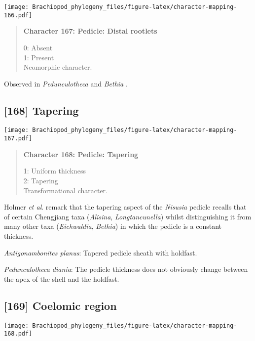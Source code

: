 \documentclass[openany]{book}
\theoremstyle{definition}
\theoremstyle{definition}
\theoremstyle{definition}
\theoremstyle{remark}
\begin{document}
\texttt{[image: Brachiopod\_phylogeny\_files/figure-latex/character-mapping-166.pdf]}

\begin{quote}
\textbf{Character 167: Pedicle: Distal rootlets}

0: Absent\\
1: Present\\
Neomorphic character.
\end{quote}

Observed in \emph{Pedunculotheca} and \emph{Bethia}
\citep{Sutton2005Silurianbrachiopods}.

\subsection*{{[}168{]} Tapering}\label{tapering}

\texttt{[image: Brachiopod\_phylogeny\_files/figure-latex/character-mapping-167.pdf]}

\begin{quote}
\textbf{Character 168: Pedicle: Tapering}

1: Uniform thickness\\
2: Tapering\\
Transformational character.
\end{quote}

Holmer \emph{et al}. \citeyearpar{Holmer2018Theattachment} remark that
the tapering aspect of the \emph{Nisusia} pedicle recalls that of
certain Chengjiang taxa (\emph{Alisina}, \emph{Longtancunella}) whilst
distinguishing it from many other taxa (\emph{Eichwaldia},
\emph{Bethia}) in which the pedicle is a constant thickness.

\hypertarget{Antigonambonites_planus-coding-168}{}
\emph{Antigonambonites planus}: Tapered pedicle sheath with holdfast.

\hypertarget{Pedunculotheca_diania-coding-168}{}
\emph{Pedunculotheca diania}: The pedicle thickness does not obviously
change between the apex of the shell and the holdfast.

\subsection*{{[}169{]} Coelomic region}\label{coelomic-region}

\texttt{[image: Brachiopod\_phylogeny\_files/figure-latex/character-mapping-168.pdf]}
\end{document}
